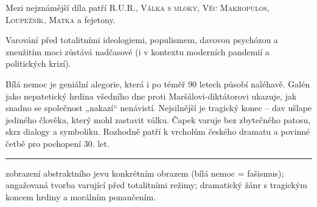 \documentclass[FGBook.tex]{subfiles}
\begin{document}
\noindent Mezi nejznámější díla patří \textsc{R.U.R.}, \textsc{Válka s mloky}, \textsc{Věc Makropulos}, \textsc{Loupežník}, \textsc{Matka} a fejetony.

\noindent Varování před totalitními ideologiemi, populismem, davovou psychózou a zneužitím moci zůstává nadčasové (i v kontextu moderních pandemií a politických krizí).

\vspace*{2em}
\noindent Bílá nemoc je geniální alegorie, která i po téměř 90 letech působí naléhavě. Galén jako nepatetický hrdina všedního dne proti Maršálovi-diktátorovi ukazuje, jak snadno se společnost „nakazí“ nenávistí. Nejsilnější je tragický konec – dav ušlape jediného člověka, který mohl zastavit válku. Čapek varuje bez zbytečného patosu, skrz dialogy a symboliku. Rozhodně patří k vrcholům českého dramatu a povinné četbě pro pochopení 30. let.

\vfill

\noindent\begin{minipage}{\textwidth}
    {\textcolor{\wpagecolor}{\rule{\linewidth}{0.4pt}}
    \footnotesize
     zobrazení abstraktního jevu konkrétním obrazem (bílá nemoc = fašismus); 
     angažovaná tvorba varující před totalitními režimy; 
     dramatický žánr s tragickým koncem hrdiny a morálním ponaučením.
    }
\end{minipage}

\newpage
\end{document}
